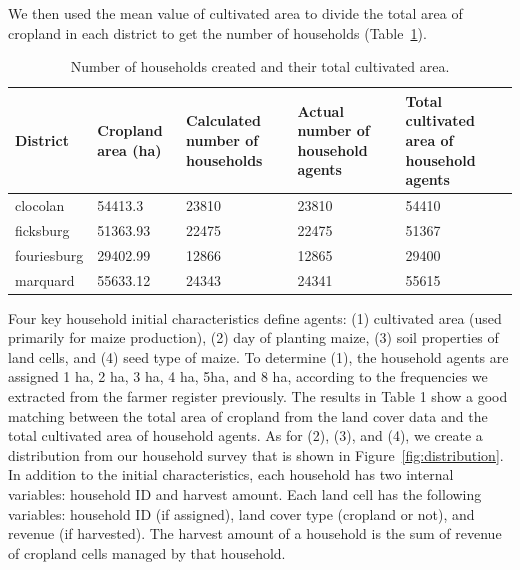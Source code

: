 \documentclass[12pt, titlepage]{article}
\begin{document}
We then used the mean value of cultivated area to divide the total area of cropland in each district to get the number of households (Table~\ref{tab:numOfHHs}).

\begin{table}[!ht] 
\centering 
\caption{Number of households created and their total cultivated area.} 
\centering
\begin{tabular}{p{2.5cm}|p{2cm}|p{3cm}|p{3cm}|p{3.5cm}} 
\hline District & Cropland area (ha) & Calculated number of households & Actual number of household agents & Total cultivated area of household agents \\
\hline 
clocolan & 54413.3 & 23810 & 23810 & 54410 \\ 
ficksburg & 51363.93 & 22475 & 22475 & 51367 \\ 
fouriesburg & 29402.99 & 12866 & 12865 & 29400 \\ 
marquard & 55633.12 & 24343 & 24341 & 55615 \\ 
\hline
\end{tabular} 
\label{tab:numOfHHs} 
\end{table}

Four key household initial characteristics define agents: (1) cultivated area (used primarily for maize production), (2) day of planting maize, (3) soil properties of land cells, and (4) seed type of maize. To determine (1), the household agents are assigned 1 ha, 2 ha, 3 ha, 4 ha, 5ha, and 8 ha, according to the frequencies we extracted from the farmer register previously. The results in Table 1 show a good matching between the total area of cropland from the land cover data and the total cultivated area of household agents. As for (2), (3), and (4), we create a distribution from our household survey that is shown in Figure~\ref{fig:distribution}. In addition to the initial characteristics, each household has two internal variables: household ID and harvest amount. Each land cell has the following variables: household ID (if assigned), land cover type (cropland or not), and revenue (if harvested). The harvest amount of a household is the sum of revenue of cropland cells managed by that household.
\end{document}
